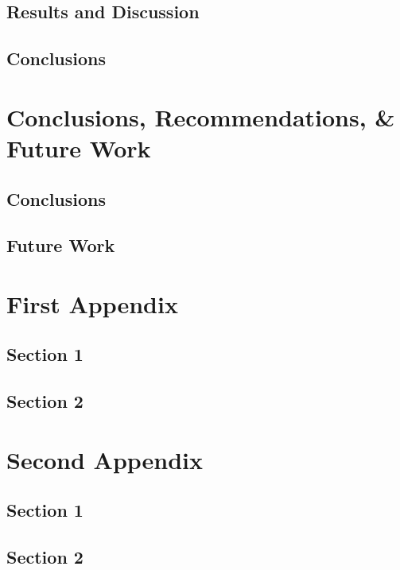 \documentclass[chapterbib]{ualberta}
\begin{document}
  \section{Results and Discussion}\label{sec:}
    \lipsum[55-57]
  \section{Conclusions}\label{sec:}
    \lipsum[12-13]
                
\chapter{Conclusions, Recommendations, \& Future Work}\label{ch:Conclusions}
  \section{Conclusions}\label{sec:}
    \lipsum[34-36]
  \section{Future Work}\label{sec:}
    \lipsum[38]\cite{TEST}
	\printreferences


\bigskip 
\clearpage\singlespacing

\printbibliography[heading=bibintoc]
\bigskip

\appendix
\chapter{First Appendix}\label{app:}
  \section{Section 1}\label{sec:}
    \lipsum[34-36]
  \section{Section 2}\label{sec:}
    \lipsum[38]

\chapter{Second Appendix}\label{app:}
  \section{Section 1}\label{sec:}
    \lipsum[34-36]
  \section{Section 2}\label{sec:}
    \lipsum[38]
\end{document}
